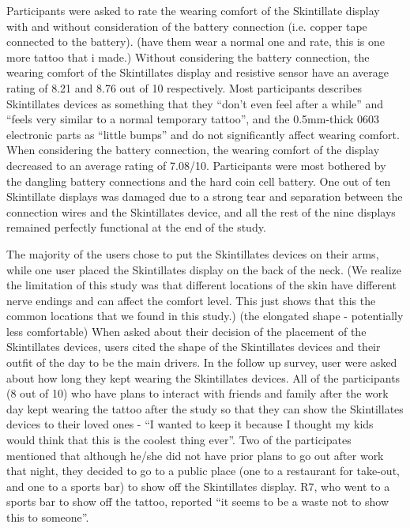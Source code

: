 \documentclass{sigchi}
\begin{document}
Participants were asked to rate the wearing comfort of the Skintillate display with and without consideration of the battery connection (i.e. copper tape connected to the battery). (have them wear a normal one and rate, this is one more tattoo that i made.) Without considering the battery connection, the wearing comfort of the Skintillates display and resistive sensor have an average rating of 8.21 and 8.76 out of 10 respectively. Most participants describes Skintillates devices as something that they ``don't even feel after a while'' and ``feels very similar to a normal temporary tattoo'', and the 0.5mm-thick 0603 electronic parts as ``little bumps'' and do not significantly affect wearing comfort. When considering the battery connection, the wearing comfort of the display decreased to an average rating of 7.08/10. Participants were most bothered by the dangling battery connections and the hard coin cell battery. One out of ten Skintillate displays was damaged due to a strong tear and separation between the connection wires and the Skintillates device, and all the rest of the nine displays remained perfectly functional at the end of the study.

The majority of the users chose to put the Skintillates devices on their arms, while one user placed the Skintillates display on the back of the neck. (We realize the limitation of this study was that different locations of the skin have different nerve endings and can affect the comfort level. This just shows that this the common locations that we found in this study.) (the elongated shape - potentially less comfortable) When asked about their decision of the placement of the Skintillates devices, users cited the shape of the Skintillates devices and their outfit of the day to be the main drivers. In the follow up survey, user were asked about how long they kept wearing the Skintillates devices. All of the participants (8 out of 10) who have plans to interact with friends and family after the work day kept wearing the tattoo after the study so that they can show the Skintillates devices to their loved ones - ``I wanted to keep it because I thought my kids would think that this is the coolest thing ever''. Two of the participates mentioned that although he/she did not have prior plans to go out after work that night, they decided to go to a public place (one to a restaurant for take-out, and one to a sports bar) to show off the Skintillates display. R7, who went to a sports bar to show off the tattoo, reported ``it seems to be a waste not to show this to someone''. 
\end{document}
